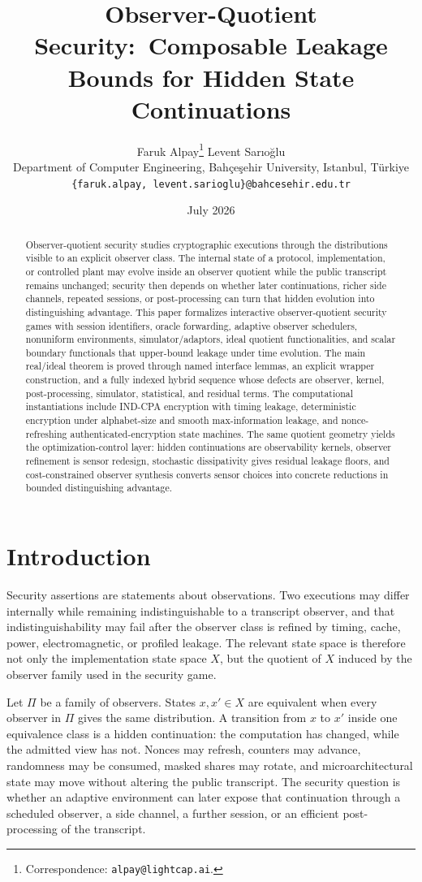 \documentclass[11pt]{article}
\title{Observer-Quotient Security:\ Composable Leakage Bounds for Hidden State Continuations}
\author{
Faruk Alpay\thanks{Correspondence: \texttt{alpay@lightcap.ai}.} \quad Levent Sar{\i}o\u{g}lu\\
Department of Computer Engineering, Bah\c{c}e\c{s}ehir University, Istanbul, T\"urkiye\\
\texttt{\{faruk.alpay, levent.sarioglu\}@bahcesehir.edu.tr}
}
\date{July 2026}
\theoremstyle{definition}
\theoremstyle{plain}
\theoremstyle{remark}
\begin{document}
\maketitle

\begin{abstract}
Observer-quotient security studies cryptographic executions through the distributions visible to an explicit observer class. The internal state of a protocol, implementation, or controlled plant may evolve inside an observer quotient while the public transcript remains unchanged; security then depends on whether later continuations, richer side channels, repeated sessions, or post-processing can turn that hidden evolution into distinguishing advantage. This paper formalizes interactive observer-quotient security games with session identifiers, oracle forwarding, adaptive observer schedulers, nonuniform environments, simulator/adaptors, ideal quotient functionalities, and scalar boundary functionals that upper-bound leakage under time evolution. The main real/ideal theorem is proved through named interface lemmas, an explicit wrapper construction, and a fully indexed hybrid sequence whose defects are observer, kernel, post-processing, simulator, statistical, and residual terms. The computational instantiations include IND-CPA encryption with timing leakage, deterministic encryption under alphabet-size and smooth max-information leakage, and nonce-refreshing authenticated-encryption state machines. The same quotient geometry yields the optimization-control layer: hidden continuations are observability kernels, observer refinement is sensor redesign, stochastic dissipativity gives residual leakage floors, and cost-constrained observer synthesis converts sensor choices into concrete reductions in bounded distinguishing advantage.
\end{abstract}
\section{Introduction}

Security assertions are statements about observations. Two executions may differ internally while remaining indistinguishable to a transcript observer, and that indistinguishability may fail after the observer class is refined by timing, cache, power, electromagnetic, or profiled leakage. The relevant state space is therefore not only the implementation state space $X$, but the quotient of $X$ induced by the observer family used in the security game.

Let $\Pi$ be a family of observers. States $x,x'\in X$ are equivalent when every observer in $\Pi$ gives the same distribution. A transition from $x$ to $x'$ inside one equivalence class is a hidden continuation: the computation has changed, while the admitted view has not. Nonces may refresh, counters may advance, randomness may be consumed, masked shares may rotate, and microarchitectural state may move without altering the public transcript. The security question is whether an adaptive environment can later expose that continuation through a scheduled observer, a side channel, a further session, or an efficient post-processing of the transcript.
\end{document}
